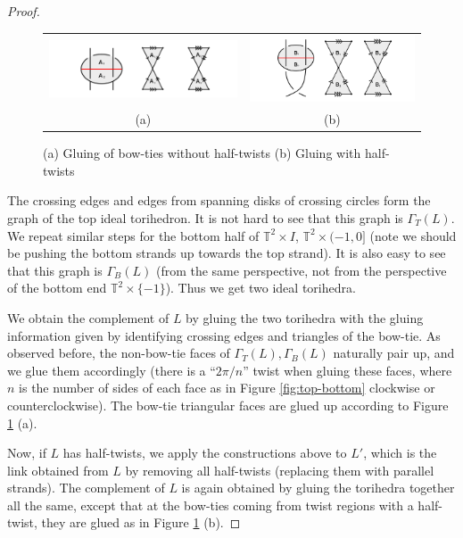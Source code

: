 \documentclass[11pt]{amsart}
\newcommand{\figref}[1]{Figure \ref{#1}}
\newcommand{\torus}{{\mathbb{T}^2}}
\theoremstyle{plain}
\theoremstyle{definition}
\begin{document}
\begin{proof}
\begin{figure}
\centering
\begin{tabular}{cc}
\includegraphics [width=8cm]{falGluing1.png}&
\includegraphics [width=7cm]{falGluing2.png}\\
(a)&(b)
\end{tabular}
\caption{(a) Gluing of bow-ties without half-twists
(b) Gluing with half-twists}
\label{fig:falGluings}
\end{figure}


The crossing edges and edges from spanning disks of crossing circles
form the graph of the top ideal torihedron.
It is not hard to see that this graph is $\Gamma_T(L)$.
We repeat similar steps for the bottom half of $\torus \times I$,
$\torus \times (-1,0]$
(note we should be pushing the bottom strands up towards the top strand).
It is also easy to see that this graph is $\Gamma_B(L)$
(from the same perspective, not from the perspective of the bottom end
$\torus \times \{-1\}$).
Thus we get two ideal torihedra.


We obtain the complement of $L$ by gluing the two torihedra with the gluing
information given by identifying crossing edges and triangles of the bow-tie.
As observed before, the non-bow-tie faces of $\Gamma_T(L),\Gamma_B(L)$
naturally pair up, and we glue them accordingly
(there is a ``$2\pi/n$'' twist when gluing these faces,
where $n$ is the number of sides of each face as in Figure
\ref{fig:top-bottom} clockwise or counterclockwise).
The bow-tie triangular faces are glued up according to
\figref{fig:falGluings} (a).


Now, if $L$ has half-twists,
we apply the constructions above to $L'$,
which is the link obtained from $L$ by removing all half-twists
(replacing them with parallel strands).
The complement of $L$ is again obtained by
gluing the torihedra together all the same,
except that at the bow-ties coming from twist regions with a half-twist,
they are glued as in Figure \ref{fig:falGluings} (b).



\end{proof}
\end{document}
